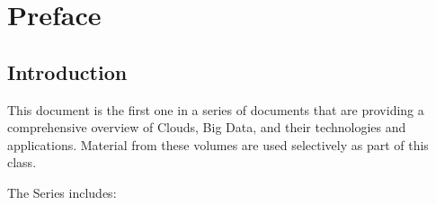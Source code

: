 
\part{Preface}





\chapter{Introduction}\label{S:p-intro}

This document is the first one in a series of documents that are
providing a comprehensive overview of Clouds, Big Data, and their
technologies and applications. Material from these volumes are used
selectively as part of this class.

The Series includes:

